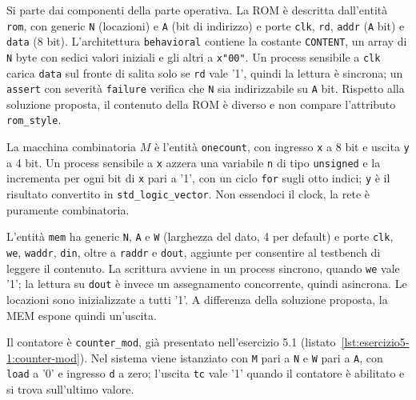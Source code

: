 \implementazione

Si parte dai componenti della parte operativa. La ROM è descritta dall'entità \texttt{rom}, con generic \texttt{N} (locazioni) e \texttt{A} (bit di indirizzo) e porte \texttt{clk}, \texttt{rd}, \texttt{addr} (\texttt{A} bit) e \texttt{data} (8 bit). L'architettura \texttt{behavioral} contiene la costante \texttt{CONTENT}, un array di \texttt{N} byte con sedici valori iniziali e gli altri a \texttt{x"00"}. Un process sensibile a \texttt{clk} carica \texttt{data} sul fronte di salita solo se \texttt{rd} vale '1', quindi la lettura è sincrona; un \texttt{assert} con severità \texttt{failure} verifica che \texttt{N} sia indirizzabile su \texttt{A} bit. Rispetto alla soluzione proposta, il contenuto della ROM è diverso e non compare l'attributo \texttt{rom\_style}.


La macchina combinatoria $M$ è l'entità \texttt{onecount}, con ingresso \texttt{x} a 8 bit e uscita \texttt{y} a 4 bit. Un process sensibile a \texttt{x} azzera una variabile \texttt{n} di tipo \texttt{unsigned} e la incrementa per ogni bit di \texttt{x} pari a '1', con un ciclo \texttt{for} sugli otto indici; \texttt{y} è il risultato convertito in \texttt{std\_logic\_vector}. Non essendoci il clock, la rete è puramente combinatoria.


L'entità \texttt{mem} ha generic \texttt{N}, \texttt{A} e \texttt{W} (larghezza del dato, 4 per default) e porte \texttt{clk}, \texttt{we}, \texttt{waddr}, \texttt{din}, oltre a \texttt{raddr} e \texttt{dout}, aggiunte per consentire al testbench di leggere il contenuto. La scrittura avviene in un process sincrono, quando \texttt{we} vale '1'; la lettura su \texttt{dout} è invece un assegnamento concorrente, quindi asincrona. Le locazioni sono inizializzate a tutti '1'. A differenza della soluzione proposta, la MEM espone quindi un'uscita.


Il contatore è \texttt{counter\_mod}, già presentato nell'esercizio 5.1 (listato~\ref{lst:esercizio5-1:counter-mod}). Nel sistema viene istanziato con \texttt{M} pari a \texttt{N} e \texttt{W} pari a \texttt{A}, con \texttt{load} a '0' e ingresso \texttt{d} a zero; l'uscita \texttt{tc} vale '1' quando il contatore è abilitato e si trova sull'ultimo valore.

